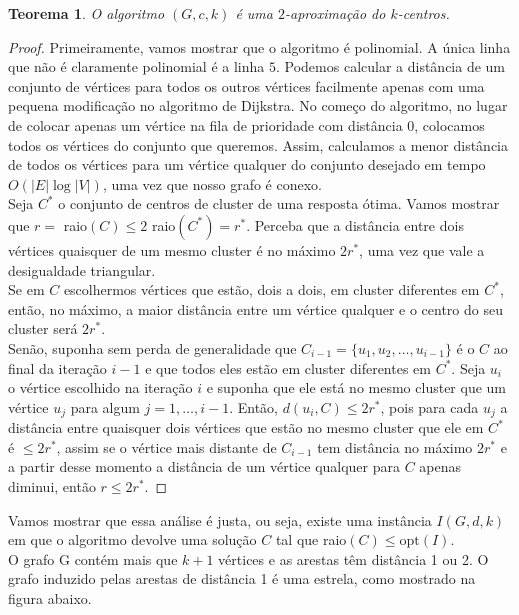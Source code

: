 \documentclass[12pt]{article}
\newcommand{\opt}{\ensuremath{\mathrm{opt}}}
\newtheorem{theorem}{Teorema}[section]
\begin{document}
    \begin{theorem}
        O algoritmo $(G,c,k)$ é uma $2$-aproximação do $k$-centros.
    \end{theorem}
    \begin{proof}
        Primeiramente, vamos mostrar que o algoritmo é polinomial. A única linha que não é claramente polinomial é a linha $5$. Podemos calcular a distância de um conjunto de vértices para todos os outros vértices facilmente apenas com uma pequena modificação no algoritmo de Dijkstra. No começo do algoritmo, no lugar de colocar apenas um vértice na fila de prioridade com distância 0, colocamos todos os vértices do conjunto que queremos. Assim, calculamos a menor distância de todos os vértices para um vértice qualquer do conjunto desejado em tempo $O(|E|\log|V|)$, uma vez que nosso grafo é conexo. \\
        Seja $C^*$ o conjunto de centros de cluster de uma resposta ótima. Vamos mostrar que $r=$ raio$(C) \leq 2$ raio$(C^*)=r^*$. Perceba que a distância entre dois vértices quaisquer de um mesmo cluster é no máximo $2r^*$, uma vez que vale a desigualdade triangular.\\ 
        Se em $C$ escolhermos vértices que estão, dois a dois, em cluster diferentes em $C^*$, então, no máximo, a maior distância entre um vértice qualquer e o centro do seu cluster será $2r^*$. \\
        Senão, suponha sem perda de generalidade que $C_{i-1} = \{ u_1,u_2,\ldots,u_{i-1}\}$ é o $C$ ao final da iteração $i-1$ e que todos eles estão em cluster diferentes em $C^*$. Seja $u_i$ o vértice escolhido na iteração $i$ e suponha que ele está no mesmo cluster que um vértice $u_j$ para algum $j=1,\ldots,i-1$. Então, $d(u_i,C) \leq 2r^*$, pois para cada $u_j$ a distância entre quaisquer dois vértices que estão no mesmo cluster que ele em $C^*$ é $\leq 2r^*$, assim se o vértice mais distante de $C_{i-1}$ tem distância no máximo $2r^*$ e a partir desse momento a distância de um vértice qualquer para $C$ apenas diminui, então $r\leq 2r^*$.
    \end{proof}
    Vamos mostrar que essa análise é justa, ou seja, existe uma instância $I(G,d,k)$ em que o algoritmo devolve uma solução $C$ tal que raio$(C) \leq \opt(I)$. \\
    O grafo G contém mais que $k+1$ vértices e as arestas têm distância 1 ou 2. O grafo induzido pelas arestas de distância 1 é uma estrela, como mostrado na figura abaixo.
\end{document}
